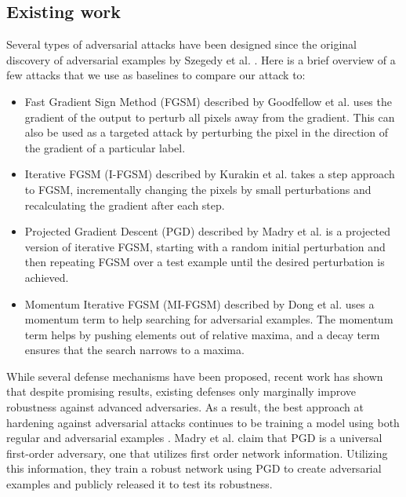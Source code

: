 \subsection{Existing work}
Several types of adversarial attacks have been designed since the original discovery of adversarial examples by Szegedy et al. \cite{szegedy2013intriguing}. Here is a brief overview of a few attacks that we use as baselines to compare our attack to:
\begin{itemize}
    \item Fast Gradient Sign Method (FGSM) described by Goodfellow et al. \cite{goodfellow6572explaining} uses the gradient of the output to perturb all pixels away from the gradient. This can also be used as a targeted attack by  perturbing the pixel in the direction of the gradient of a particular label.
    \item Iterative FGSM (I-FGSM) described by Kurakin et al. \cite{kurakin2016adversarial} takes a step approach to FGSM, incrementally changing the pixels by small perturbations and recalculating the gradient after each step.
    \item Projected Gradient Descent (PGD) described by Madry et al. \cite{madry2017towards} is a projected version of iterative FGSM, starting with a random initial perturbation and then repeating FGSM over a test example until the desired perturbation is achieved.
    \item Momentum Iterative FGSM (MI-FGSM) described by Dong et al. \cite{dong2017boosting} uses a momentum term to help searching for adversarial examples. The momentum term helps by pushing elements out of relative maxima, and a decay term ensures that the search narrows to a maxima.
\end{itemize}
While several defense mechanisms have been proposed, recent work \cite{carlini2017towards} has shown that despite promising results, existing defenses only marginally improve robustness against advanced adversaries. As a result, the best approach at hardening against adversarial attacks continues to be training a model using both regular and adversarial examples \cite{madry2017towards}. Madry et al. claim that PGD is a universal first-order adversary, one that utilizes first order network information. Utilizing this information, they train a robust network using PGD to create adversarial examples and publicly released it to test its robustness.